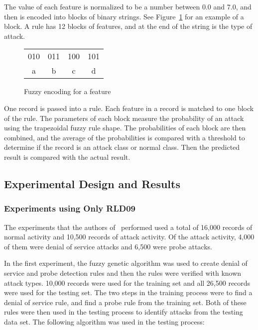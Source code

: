 \documentclass{sig-alternate}
\begin{document}
The value of each feature is normalized to be a number between 0.0 and 7.0, and then is encoded into blocks of binary strings. See Figure~\ref{fig:fuzEncodingForFeature} for an example of a block. A rule has 12 blocks of features, and at the end of the string is the type of attack. 

\begin{figure}
\centering
\caption{Fuzzy encoding for a feature}
\begin{tabular}{|c|c|c|c|} \hline
010 & 011 & 100 & 101\\
a & b & c & d\\
\hline\end{tabular}
\label{fig:fuzEncodingForFeature}
\end{figure}

One record is passed into a rule. Each feature in a record is matched to one block of the rule. The parameters of each block measure the probability of an attack using the trapezoidal fuzzy rule shape. The probabilities of each block are then combined, and the average of the probabilities is compared with a threshold to determine if the record is an attack class or normal class. Then the predicted result is compared with the actual result.




\subsection{Experimental Design and Results}
\subsubsection{Experiments using Only RLD09}
The experiments that the authors of~\cite{6496342, 6559603} performed used a total of 16,000 records of normal activity and 10,500 records of attack activity. Of the attack activity, 4,000 of them were denial of service attacks and 6,500 were probe attacks.

In the first experiment, the fuzzy genetic algorithm was used to create denial of service and probe detection rules and then the rules were verified with known attack types. 10,000 records were used for the training set and all 26,500 records were used for the testing set. The two steps in the training process were to find a denial of service rule, and find a probe rule from the training set. Both of these rules were then used in the testing process to identify attacks from the testing data set. The following algorithm was used in the testing process:
\end{document}
